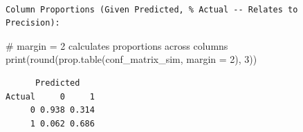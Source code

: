 \documentclass[
  letterpaper,
]{scrbook}
\newenvironment{Shaded}{\begin{snugshade}}{\end{snugshade}}
\newcommand{\AttributeTok}[1]{\textcolor[rgb]{0.40,0.45,0.13}{#1}}
\newcommand{\CommentTok}[1]{\textcolor[rgb]{0.37,0.37,0.37}{#1}}
\newcommand{\DecValTok}[1]{\textcolor[rgb]{0.68,0.00,0.00}{#1}}
\newcommand{\FunctionTok}[1]{\textcolor[rgb]{0.28,0.35,0.67}{#1}}
\newcommand{\NormalTok}[1]{\textcolor[rgb]{0.00,0.23,0.31}{#1}}
\begin{document}
\begin{verbatim}

Column Proportions (Given Predicted, % Actual -- Relates to Precision):
\end{verbatim}

\begin{Shaded}
\begin{Highlighting}[]
\CommentTok{\# margin = 2 calculates proportions across columns}
\FunctionTok{print}\NormalTok{(}\FunctionTok{round}\NormalTok{(}\FunctionTok{prop.table}\NormalTok{(conf\_matrix\_sim, }\AttributeTok{margin =} \DecValTok{2}\NormalTok{), }\DecValTok{3}\NormalTok{))}
\end{Highlighting}
\end{Shaded}

\begin{verbatim}
      Predicted
Actual     0     1
     0 0.938 0.314
     1 0.062 0.686
\end{verbatim}
\end{document}
